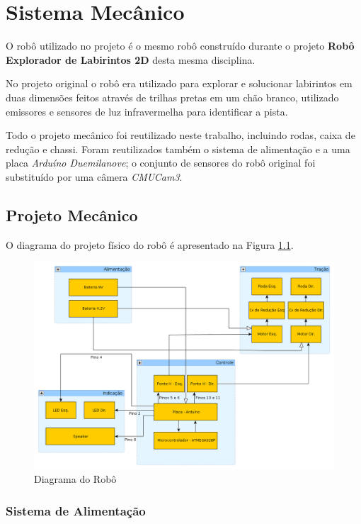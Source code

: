 \chapter{Sistema Mecânico}

O robô utilizado no projeto é o mesmo robô construído durante o projeto \textbf{Robô Explorador de Labirintos 2D} \cite{Robo2d} desta mesma disciplina.

No projeto original o robô era utilizado para explorar e solucionar labirintos em duas dimensões feitos através de trilhas pretas em um chão branco, utilizado emissores e sensores de luz infravermelha para identificar a pista. 

Todo o projeto mecânico foi reutilizado neste trabalho, incluindo rodas, caixa de redução e chassi. Foram reutilizados também o sistema de alimentação e a uma placa \textit{Arduíno Duemilanove}; o conjunto de sensores do robô original foi substituído por uma câmera \textit{CMUCam3}.

\section{Projeto Mecânico}

O diagrama do projeto físico do robô é apresentado na Figura \ref{int_fig01}.

\begin{figure}[h!]
    \center
    \includegraphics[scale=0.3]{imagens/robo.png}
    \caption{Diagrama do Robô}
    \label{int_fig01}
\end{figure}

\subsection{Sistema de Alimentação}

